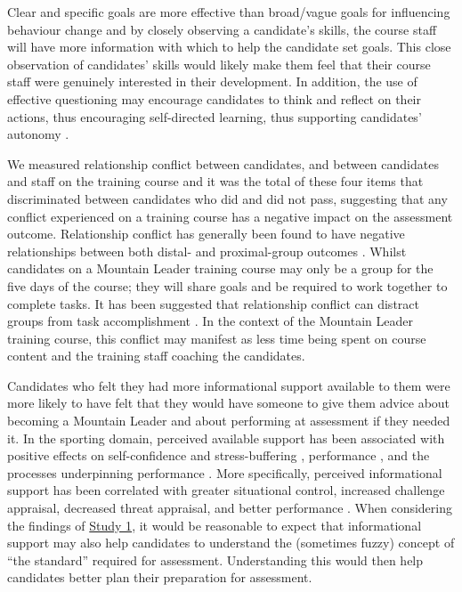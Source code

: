 \documentclass[
  12pt,
  a4paper,
]{book}
\begin{document}
Clear and specific goals are more effective than broad/vague goals for influencing behaviour change \citep{Gould2005} and by closely observing a candidate's skills, the course staff will have more information with which to help the candidate set goals. This close observation of candidates' skills would likely make them feel that their course staff were genuinely interested in their development. In addition, the use of effective questioning may encourage candidates to think and reflect on their actions, thus encouraging self-directed learning, thus supporting candidates' autonomy \citep{Wagstaff2018}.

We measured relationship conflict between candidates, and between candidates and staff on the training course and it was the total of these four items that discriminated between candidates who did and did not pass, suggesting that any conflict experienced on a training course has a negative impact on the assessment outcome. Relationship conflict has generally been found to have negative relationships between both distal- and proximal-group outcomes \citep[see][]{deWit2012}. Whilst candidates on a Mountain Leader training course may only be a group for the five days of the course; they will share goals and be required to work together to complete tasks. It has been suggested that relationship conflict can distract groups from task accomplishment \citep{Evan1965, Jehn1995}. In the context of the Mountain Leader training course, this conflict may manifest as less time being spent on course content and the training staff coaching the candidates.

Candidates who felt they had more informational support available to them were more likely to have felt that they would have someone to give them advice about becoming a Mountain Leader and about performing at assessment if they needed it. In the sporting domain, perceived available support has been associated with positive effects on self-confidence and stress-buffering \citep{Rees2007}, performance \citep{Freeman2009}, and the processes underpinning performance \citep{Rees1999}. More specifically, perceived informational support has been correlated with greater situational control, increased challenge appraisal, decreased threat appraisal, and better performance \citep{Freeman2009}. When considering the findings of \protect\hyperlink{ml-qualitative}{Study 1}, it would be reasonable to expect that informational support may also help candidates to understand the (sometimes fuzzy) concept of ``the standard'' required for assessment. Understanding this would then help candidates better plan their preparation for assessment.
\end{document}
